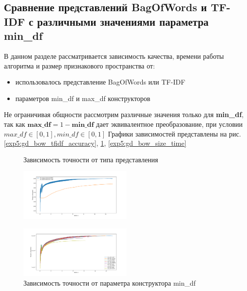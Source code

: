 \documentclass[a4paper, 11pt]{article}
\begin{document}
        \subsection{Сравнение представлений BagOfWords и TF-IDF с различными значениями параметра min\_df}
            В данном разделе рассматривается зависимость качества, времени работы алгоритма и размер признакового пространства от:
            \begin{itemize}
                \item использовалось представление BagOfWords или TF-IDF
                \item параметров min\_df и max\_df конструкторов
            \end{itemize}
            Не ограничивая общности рассмотрим различные значения только для \textbf{min\_df}, так как $\textbf{max\_df} = 1 - \textbf{min\_df}$ дает эквивалентное преобразование, при условии $max\_df \in [0, 1], min\_df \in [0, 1]$
            Графики зависимостей представлены на рис. \ref{exp5:gd_bow_tfidf_accuracy}, \ref{exp5:min_df_accuracy}, \ref{exp5:gd_bow_size_time}
            \begin{figure}[H] \label{exp5}
                \begin{multicols}{2}
                    \begin{center}
                        \caption{Зависимость  точности от типа представления} \label{exp5:gd_bow_tfidf_accuracy}
                        \includegraphics[width=0.5\textwidth, height=0.25\textheight]{../graphs/GD_BOW_TFIDF_alpha=1_beta=0,001_train_size=83530.pdf}
                        
                        \caption{Зависимость  точности от параметра конструктора min\_df} \label{exp5:min_df_accuracy}
                        \includegraphics[width=0.5\textwidth, height=0.25\textheight]{../graphs/GD_min_df_accuracy.pdf}
                    \end{center}
                \end{multicols}
            \end{figure}
        
\end{document}
